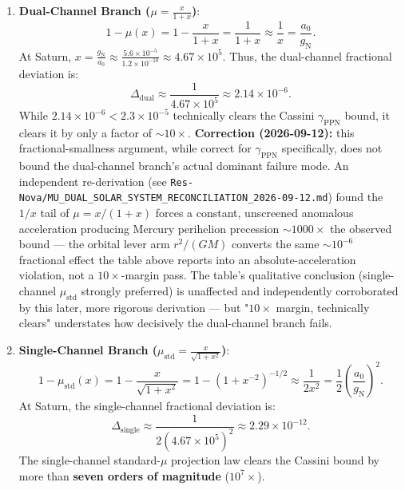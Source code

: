 \documentclass[11pt,a4paper]{article}
\theoremstyle{definition}
\begin{document}
\begin{enumerate}
\item \textbf{Dual-Channel Branch ($\mu = \frac{x}{1+x}$)}:
\begin{equation}
1 - \mu(x) = 1 - \frac{x}{1+x} = \frac{1}{1+x} \approx \frac{1}{x} = \frac{a_0}{g_{\text{N}}}.
\end{equation}
At Saturn, $x = \frac{g_{\text{N}}}{a_0} \approx \frac{5.6 \times 10^{-5}}{1.2 \times 10^{-10}} \approx 4.67 \times 10^5$.
Thus, the dual-channel fractional deviation is:
\begin{equation}
\Delta_{\text{dual}} \approx \frac{1}{4.67 \times 10^5} \approx 2.14 \times 10^{-6}.
\end{equation}
While $2.14 \times 10^{-6} < 2.3 \times 10^{-5}$ technically clears the Cassini $\gamma_{\text{PPN}}$ bound, it clears it by only a factor of $\sim 10\times$. \textbf{Correction (2026-09-12):} this fractional-smallness argument, while correct for $\gamma_{\text{PPN}}$ specifically, does not bound the dual-channel branch's actual dominant failure mode. An independent re-derivation (see \texttt{Res-Nova/MU\_DUAL\_SOLAR\_SYSTEM\_RECONCILIATION\_2026-09-12.md}) found the $1/x$ tail of $\mu=x/(1+x)$ forces a constant, unscreened anomalous acceleration producing Mercury perihelion precession $\sim 1000\times$ the observed bound — the orbital lever arm $r^2/(GM)$ converts the same $\sim10^{-6}$ fractional effect the table above reports into an absolute-acceleration violation, not a $10\times$-margin pass. The table's qualitative conclusion (single-channel $\mu_{\text{std}}$ strongly preferred) is unaffected and independently corroborated by this later, more rigorous derivation — but "$10\times$ margin, technically clears" understates how decisively the dual-channel branch fails.

\item \textbf{Single-Channel Branch ($\mu_{\text{std}} = \frac{x}{\sqrt{1+x^2}}$)}:
\begin{equation}
1 - \mu_{\text{std}}(x) = 1 - \frac{x}{\sqrt{1+x^2}} = 1 - (1 + x^{-2})^{-1/2} \approx \frac{1}{2x^2} = \frac{1}{2}\left( \frac{a_0}{g_{\text{N}}} \right)^2.
\end{equation}
At Saturn, the single-channel fractional deviation is:
\begin{equation}
\Delta_{\text{single}} \approx \frac{1}{2 (4.67 \times 10^5)^2} \approx 2.29 \times 10^{-12}.
\end{equation}
The single-channel standard-$\mu$ projection law clears the Cassini bound by more than \textbf{seven orders of magnitude} ($10^7\times$).
\end{enumerate}
\end{document}
